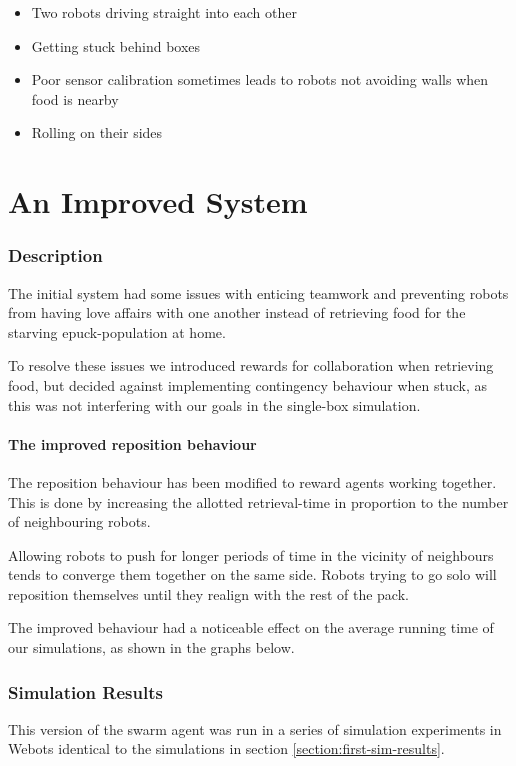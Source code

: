 \documentclass[a4paper]{article}
\begin{document}
\begin{itemize}
	\item Two robots driving straight into each other
	\item Getting stuck behind boxes
	\item Poor sensor calibration sometimes leads to robots not avoiding walls when food is nearby
	\item Rolling on their sides
\end{itemize}

\part{An Improved System}

\section{Description}
The initial system had some issues with enticing teamwork and preventing robots from having love affairs with one another instead of retrieving food for the starving epuck-population at home.

To resolve these issues we introduced rewards for collaboration when retrieving food, but decided against implementing contingency behaviour when stuck, as this was not interfering with our goals in the single-box simulation.

\subsection{The improved reposition behaviour}
The reposition behaviour has been modified to reward agents working together. This is done by increasing the allotted retrieval-time in proportion to the number of neighbouring robots.

Allowing robots to push for longer periods of time in the vicinity of neighbours tends to converge them together on the same side. Robots trying to go solo will reposition themselves until they realign with the rest of the pack.

The improved behaviour had a noticeable effect on the average running time of our simulations, as shown in the graphs below.

\section{Simulation Results}
This version of the swarm agent was run in a series of simulation experiments in Webots identical to the simulations in section \vref{section:first-sim-results}.
\end{document}
